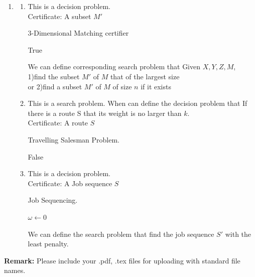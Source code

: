 \documentclass[12pt,a4paper]{article}
\makeatletter
\newtheorem*{solution}{Solution}
\theoremstyle{definition}
\renewenvironment{solution}[1][Solution] {\par\pushQED{\qed}\normalfont\topsep6\p@\@plus6\p@\relax\trivlist\item[\hskip\labelsep\bfseries#1\@addpunct{.}]\ignorespaces}{\popQED\endtrivlist\@endpefalse} \makeatother
\makeatother
\begin{document}
\begin{enumerate}
\begin{enumerate}
	\end{enumerate}
	\begin{solution}
	    \begin{enumerate}
	        \item This is a decision problem.\\
	        Certificate: A subset $M'$
	        ~\par
	  \begin{algorithm}[H]
		\BlankLine
		\caption{3-Dimensional Matching certifier}\label{3D}
		\Return True
	\end{algorithm}
	We can define corresponding search problem that Given $X,Y,Z,M$,\\1)find the subset $M'$ of $M$ that of the largest size \\or 2)find a subset $M'$ of $M$ of size $n$ if it exists
	\item This is a search problem. When can define the decision problem that If there is a route S that its weight is no larger than $k$.\\
	Certificate: A route $S$\\
	\begin{algorithm}[H]
		\BlankLine
		\caption{Travelling Salesman Problem.}\label{TSP}
		\Return False
	\end{algorithm}
	\item 
	This is a decision problem.\\
	Certificate: A Job sequence $S$\\
	\begin{algorithm}[H]
		\BlankLine
		\caption{Job Sequencing.}\label{JS}
		$\omega\leftarrow 0$\\
	\end{algorithm}
	We can define the search problem that find the job sequence $S'$ with the least penalty.
	    \end{enumerate}
	\end{solution}
\end{enumerate}

\textbf{Remark:} Please include your .pdf, .tex files for uploading with standard file names.
\newpage


\end{document}
